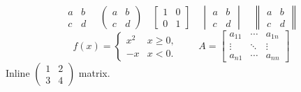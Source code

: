 \documentclass{article}
\begin{document}
\[\begin{matrix}a&b\\c&d\end{matrix}\quad\begin{pmatrix}a&b\\c&d\end{pmatrix}\quad\begin{bmatrix}1&0\\0&1\end{bmatrix}\quad\begin{vmatrix}a&b\\c&d\end{vmatrix}\quad\begin{Vmatrix}a&b\\c&d\end{Vmatrix}\]
\[f(x)=\begin{cases}x^2&x\ge0,\\-x&x<0.\end{cases}\qquad A=\begin{bmatrix}a_{11}&\cdots&a_{1n}\\\vdots&\ddots&\vdots\\a_{n1}&\cdots&a_{nn}\end{bmatrix}\]
Inline $\left(\begin{smallmatrix}1&2\\3&4\end{smallmatrix}\right)$ matrix.
\end{document}

